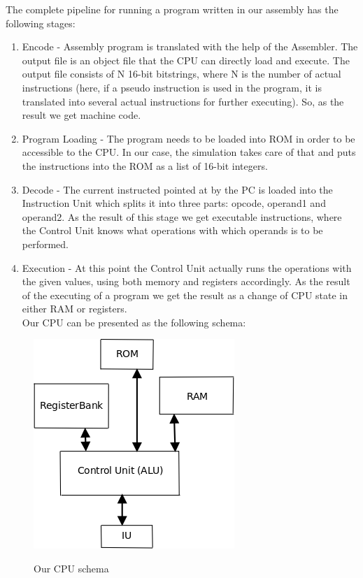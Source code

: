 \documentclass[12pt,a4paper]{scrartcl}
\begin{document}
The complete pipeline for running a program written in our assembly has the following stages:
\begin{enumerate}
	\item Encode - Assembly program is translated with the help of the Assembler. The output file is an object file that the CPU can directly load and execute. The output file consists of N 16-bit bitstrings, where N is the number of actual instructions (here, if a pseudo instruction is used in the program, it is translated into several actual instructions for further executing). So, as the result we get machine code.
	\item Program Loading - The program needs to be loaded into ROM in order to be accessible to the CPU. In our case, the simulation takes care of that and puts the instructions into the ROM as a list of 16-bit integers.
	\item Decode - The current instructed pointed at by the PC is loaded into the Instruction Unit which splits it into three parts: opcode, operand1 and operand2. As the result of this stage we get executable instructions, where the Control Unit knows what operations with which operands is to be performed. 
	\item Execution - At this point the Control Unit actually runs the operations with the given values, using both memory and registers accordingly. As the result of the executing of a program we get the result as a change of CPU state in either RAM or registers.\\
	
Our CPU can be presented as the following schema:
\end{enumerate} 

\begin{figure}[h]
	\centering
	\includegraphics[scale=0.6]{pics/ourCPU.png}\\
	\caption{Our CPU schema}
\end{figure}
\end{document}

